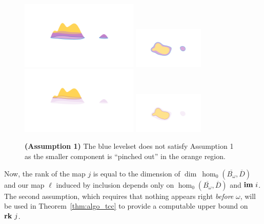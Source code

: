\begin{figure}[htbp]\label{fig:assumption1}
  \centering
  \includegraphics[trim=200 300 200 200, clip, width=0.5\textwidth]{figures/surf-ass1_C_side.png}
  \includegraphics[trim=300 150 200 200, clip, width=0.3\textwidth]{figures/surf-ass1_C_top.png}
  \includegraphics[trim=200 300 200 200, clip, width=0.5\textwidth]{figures/surf-ass1_D_side.png}
  \includegraphics[trim=300 150 200 200, clip, width=0.3\textwidth]{figures/surf-ass1_D_top.png}
  \caption{\textbf{(Assumption 1)} The blue levelset does not satisfy Assumption 1 as the smaller component is ``pinched out'' in the orange region.}
\end{figure}

Now, the rank of the map $j$ is equal to the dimension of $\dim~\hom_0(\overline{B_\omega}, \overline{D})$ and our map $\ell$ induced by inclusion depends only on $\hom_0(\overline{B_\omega}, \overline{D})$ and $\mathbf{im}~i$.
The second assumption, which requires that nothing appears right \emph{before} $\omega$, will be used in Theorem~\ref{thm:algo_tcc} to provide a computable upper bound on $\mathbf{rk}~j$.

